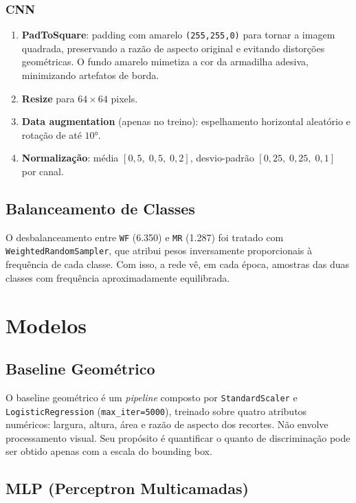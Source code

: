 \documentclass[conference]{IEEEtran}
\begin{document}
\subsubsection{CNN}
\begin{enumerate}
    \item \textbf{PadToSquare}: padding com amarelo \texttt{(255,255,0)}
    para tornar a imagem quadrada, preservando a razão de aspecto original
    e evitando distorções geométricas. O fundo amarelo mimetiza a cor
    da armadilha adesiva, minimizando artefatos de borda.
    \item \textbf{Resize} para $64 \times 64$ pixels.
    \item \textbf{Data augmentation} (apenas no treino): espelhamento
    horizontal aleatório e rotação de até $10°$.
    \item \textbf{Normalização}: média $[0{,}5,\;0{,}5,\;0{,}2]$,
    desvio-padrão $[0{,}25,\;0{,}25,\;0{,}1]$ por canal.
\end{enumerate}

\subsection{Balanceamento de Classes}

O desbalanceamento entre \texttt{WF} (6.350) e \texttt{MR} (1.287)
foi tratado com \texttt{WeightedRandomSampler}, que atribui pesos
inversamente proporcionais à frequência de cada classe. Com isso, a
rede vê, em cada época, amostras das duas classes com frequência
aproximadamente equilibrada.

\section{Modelos}

\subsection{Baseline Geométrico}

O baseline geométrico é um \textit{pipeline} composto por
\texttt{StandardScaler} e \texttt{LogisticRegression}
(\texttt{max\_iter=5000}), treinado sobre quatro atributos numéricos:
largura, altura, área e razão de aspecto dos recortes. Não envolve
processamento visual. Seu propósito é quantificar o quanto de
discriminação pode ser obtido apenas com a escala do bounding box.

\subsection{MLP (Perceptron Multicamadas)}
\end{document}
